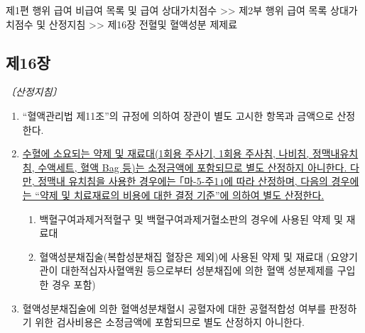 \begin{mdframed}[linecolor=blue,middlelinewidth=2]  
제1편 행위 급여 \cntrdot{}  비급여 목록 및 급여 상대가치점수 >> 제2부 행위 급여 목록\cntrdot{} 상대가치점수 및 산정지침 >> 제16장 전혈및 혈액성분 제제료 
\end{mdframed}
\subsection{제16장 }
\emph{〔산정지침〕}
\begin{enumerate}[(1)]\tightlist
\item “혈액관리법 제11조”의 규정에 의하여 장관이 별도 고시한 항목과 금액으로 산정한다.
\item \uline{수혈에 소요되는 약제 및 재료대(1회용 주사기, 1회용 주사침, 나비침, 정맥내유치침, 수액세트, 혈액 Bag 등)는 소정금액에 포함되므로 별도 산정하지 아니한다. 다만, 정맥내 유치침을 사용한 경우에는 ｢마-5-주1｣에 따라 산정하며, 다음의 경우에는 “약제 및 치료재료의 비용에 대한 결정 기준”에 의하여 별도 산정한다.}
	\begin{enumerate}[(가)]\tightlist
	\item 백혈구여과제거적혈구 및 백혈구여과제거혈소판의 경우에 사용된 약제 및 재료대
	\item 혈액성분채집술(복합성분채집 혈장은 제외)에 사용된 약제 및 재료대 (요양기관이 대한적십자사혈액원 등으로부터 성분채집에 의한 혈액 성분제제를 구입한 경우 포함)
	\end{enumerate}
\item 혈액성분채집술에 의한 혈액성분채혈시 공혈자에 대한 공혈적합성 여부를
판정하기 위한 검사비용은 소정금액에 포함되므로 별도 산정하지 아니한다.
\end{enumerate}